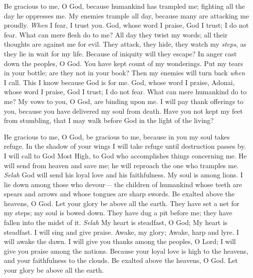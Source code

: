 \begin{biblechapter} %
 Be gracious to me, O God, because humankind has trampled me; 
fighting all the day he oppresses me.
\verse My enemies trample all day, 
because many are attacking me proudly.
\verse \textit{When} I fear, I trust you.
\verse God, whose word I praise, 
God I trust; I do not fear. 
What can mere flesh do to me?
\verse All day they twist my words; 
all their thoughts are against me for evil.
\verse They attack, they hide, they watch my \textit{steps}, 
as they lie in wait for my life.
\verse Because of iniquity will they escape? 
In anger cast down the peoples, O God.
\verse You have kept count of my wonderings. 
Put my tears in your bottle; 
are they not in your book?
\verse Then my enemies will turn back \textit{when} I call. 
This I know because God is for me.
\verse God, whose word I praise, 
Adonai, whose word I praise,
\verse God I trust; I do not fear. 
What can mere humankind do to me?
\verse My vows to you, O God, are binding upon me. 
I will pay thank offerings to you,
\verse because you have delivered my soul from death. 
Have you not kept my feet from stumbling, 
that I may walk before God 
in the light of the living?
\end{biblechapter}

\begin{biblechapter} %
 Be gracious to me, O God, be gracious to me, 
because in you my soul takes refuge. 
In the shadow of your wings I will take refuge 
until destruction passes by.
\verse I will call to God Most High, 
to God who accomplishes things concerning me.
\verse He will send from heaven and save me; 
he will reproach the one who tramples me. \textit{Selah} 
God will send his loyal love and his faithfulness.
\verse My soul is among lions. 
I lie down among those who devour— 
the children of humankind whose teeth are spears and arrows 
and whose tongues are sharp swords.
\verse Be exalted above the heavens, O God. 
Let your glory be above all the earth.
\verse They have set a net for my steps; 
my soul is bowed down. 
They have dug a pit before me; 
they have fallen into the midst of it. \textit{Selah}
\verse My heart is steadfast, O God; 
My heart is steadfast. 
I will sing and give praise.
\verse Awake, my glory; 
Awake, harp and lyre. 
I will awake the dawn.
\verse I will give you thanks among the peoples, O Lord; 
I will give you praise among the nations.
\verse Because your loyal love is high to the heavens, 
and your faithfulness to the clouds.
\verse Be exalted above the heavens, O God. 
Let your glory be above all the earth.
\end{biblechapter}


